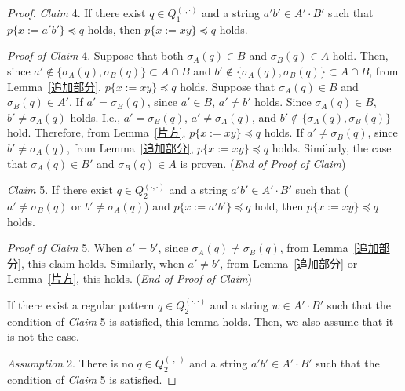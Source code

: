 \begin{proof}
\smallskip

\noindent
\textit{Claim} 4.
If there exist $q \in Q_{1}^{(\cdot,\cdot)}$ and a string $a'b' \in A'\cdot B'$ such that $p\{x:=a'b'\} \preceq q$ holds, then $p\{x:=xy\} \preceq q$ holds.

\smallskip

\noindent
\textit{Proof of Claim} 4.
Suppose that both $\sigma_{A}(q) \in B$ and $\sigma_{B}(q) \in A$ hold. Then, since $a' \not\in \{\sigma_{A}(q), \sigma_{B}(q)\} \subset A\cap B$ and $b' \not\in \{\sigma_{A}(q), \sigma_{B}(q)\} \subset A\cap B$, from Lemma~\ref{追加部分}, $p\{x:=xy\} \preceq q$ holds.
Suppose that $\sigma_{A}(q)\in B$ and $\sigma_{B}(q)\in A'$.
If $a' = \sigma_{B}(q)$, since $a' \in B$, $a' \not= b'$ holds.
Since $\sigma_{A}(q)\in B$, $b' \not= \sigma_{A}(q)$ holds.
I.e., $a' = \sigma_{B}(q)$, $a' \not= \sigma_{A}(q)$, and $b' \not\in \{\sigma_{A}(q), \sigma_{B}(q)\}$ hold.
Therefore, from Lemma~\ref{片方}, $p\{x:=xy\} \preceq q$ holds.
If $a' \not= \sigma_{B}(q)$, since $b' \not= \sigma_{A}(q)$, from Lemma~\ref{追加部分}, $p\{x:=xy\} \preceq q$ holds.
Similarly, the case that $\sigma_{A}(q)\in B'$ and $\sigma_{B}(q)\in A$ is proven. (\textit{End of Proof of Claim})

\smallskip

\noindent
\textit{Claim} 5.
If there exist $q \in Q_{2}^{(\cdot,\cdot)}$ and a string $a'b' \in A'\cdot B'$ such that ($a' \not= \sigma_{B}(q)$ or $b' \not= \sigma_{A}(q)$) and $p\{x:=a'b'\} \preceq q$ hold, then $p\{x:=xy\} \preceq q$ holds.
 
\smallskip

\noindent
\textit{Proof of Claim} 5.
When $a'=b'$, since $\sigma_{A}(q) \not= \sigma_{B}(q)$, from Lemma~\ref{追加部分}, this claim holds. Similarly, when $a' \not = b'$, from Lemma~\ref{追加部分} or Lemma~\ref{片方}, this holds.  (\textit{End of Proof of Claim})
  
\smallskip

\noindent
If there exist a regular pattern $q \in Q_{2}^{(\cdot,\cdot)}$ and a string $w \in A'\cdot B'$ such that the condition of \textit{Claim} 5 is satisfied, this lemma holds. Then, we also assume that it is not the case.

\smallskip

\noindent
\textit{Assumption} 2.
There is no $q \in Q_{2}^{(\cdot,\cdot)}$ and a string $a'b' \in A'\cdot B'$ such that the condition of \textit{Claim} 5 is satisfied.

\smallskip


\end{proof}
